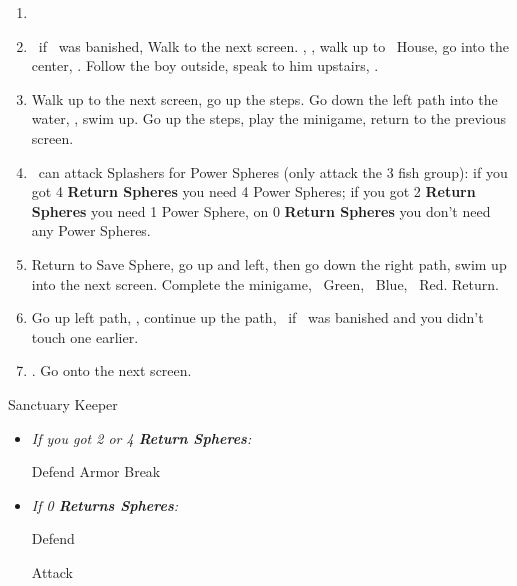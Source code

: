 \begin{enumerate}[resume]
    \item \formation{\tidus}{\kimahri}{\auron}
    \item \save\ if \bahamut\ was banished, Walk to the next screen. \skippablefmv[0:20], \sd, walk up to \tidus\ House, go into the center, \sd. Follow the boy outside, speak to him upstairs, \sd.
    \item Walk up to the next screen, go up the steps. Go down the left path into the water, \sd, swim up. Go up the steps, play the minigame, return to the previous screen.
    \item \tidus\ can attack Splashers for Power Spheres (only attack the 3 fish group): if you got 4 \textbf{Return Spheres} you need 4 Power Spheres; if you got 2 \textbf{Return Spheres} you need 1 Power Sphere, on 0 \textbf{Return Spheres} you don't need any Power Spheres.
    \item Return to Save Sphere, go up and left, then go down the right path, swim up into the next screen. Complete the minigame, \rikku\ Green, \tidus\ Blue, \wakka\ Red. Return.
    \item Go up left path, \sd, continue up the path, \save\ if \bahamut\ was banished and you didn't touch one earlier.
    \item \formation{\tidus}{\yuna}{\wakka}. Go onto the next screen.
\end{enumerate}
\bothvfill
\winvfill
\lossvfill
\begin{battle}[40000]{Sanctuary Keeper}
    \begin{itemize}
        \item \textit{If you got 2 or 4 \textbf{Return Spheres}:}
        \begin{itemize}
            \yunaf Defend
            \tidusf Armor Break
        \end{itemize}
        \item \textit{If 0 \textbf{Returns Spheres}:}
        \begin{itemize}
            \tidusf Defend
        \end{itemize}
        \summon{\bahamut}
        \bahamutf Attack
    \end{itemize}
\end{battle}
